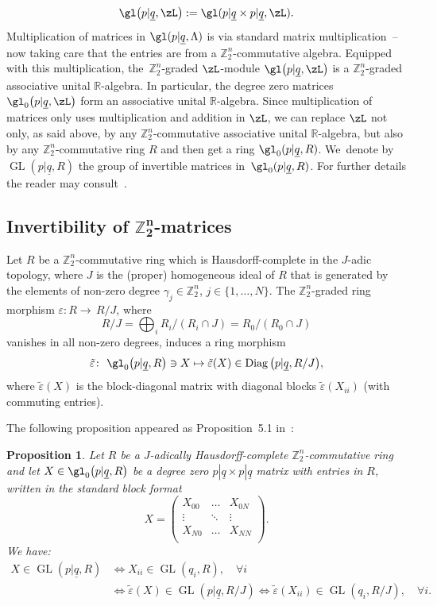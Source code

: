 \documentclass[10pt,a4paper]{amsart}
\newcommand{\op}[1]{\operatorname{#1}}
\DeclareMathOperator{\GL}{GL}
\newcommand{\R}{{\mathbb R}}
\newcommand{\Z}{{\mathbb Z}}
\def\ul{\underline}
\def\ul{\underline}
\newcommand{\0}{\otimes}
\newcommand{\z}{\Z_2^n}
\numberwithin{equation}{section}
\newtheorem{Proposition}[Theorem]{Proposition}
 { \theoremstyle{definition}
\newtheorem{Definition}[Theorem]{Definition}
\newtheorem{Example}[Theorem]{Example}
\newtheorem{Remark}[Theorem]{Remark} }
\begin{document}
\[
\gl\big(p|\ul q,\zL\big):=\gl(p|\ul q \times p|\ul q,\zL).
\]
Multiplication of matrices in $\gl(p|\ul{q},\Lambda)$ is via standard matrix multiplication~-- now taking care that the entries are from a $\Z_2^n$-commutative algebra. Equipped with this multiplication, the~$\z$-graded $\zL$-module $\gl\big(p|\ul q,\zL\big)$ is a $\z$-graded associative unital $\R$-algebra. In particular, the degree zero matrices $\gl_0\big(p|\ul q,\zL\big)$ form an associative unital $\R$-algebra. Since multiplication of matrices only uses multiplication and addition in $\zL$, we can replace $\zL$ not only, as said above, by any $\z$-commutative associative unital $\R$-algebra, but also by any $\z$-commutative ring $R$ and then get a ring $\gl_0(p|\ul q,R)$. We~denote by $\GL(p|\ul q,R)$ the group of invertible matrices in~$\gl_0(p|\ul q,R)$. For further details the reader may consult~\cite{Covolo:2012}.

\subsection[Invertibility of Z2n-matrices]{Invertibility of $\boldsymbol{\z}$-matrices}
Let $R$ be a $\z$-commutative ring which is Hausdorff-complete in the $J$-adic topology, where
$J$ is the (proper) homogeneous ideal of $R$ that is generated by the elements of non-zero degree $\gamma_j\in\Z_2^n$, $j\in\{1,\dots,N\}$. The $\Z_2^n$-graded ring morphism
$\varepsilon\colon R \to \,R/J$, where
\[
R/J=\bigoplus_iR_i/(R_i\cap J)=R_0/(R_0\cap J)
\]
vanishes in all non-zero degrees, induces a ring morphism
\[
\tilde\varepsilon\colon\ \gl_0\big(p|\ul{q},R\big)\ni X\mapsto \tilde\varepsilon(X)\in\op{Diag}\big(p|\ul{q},R/J\big),
\]
where $\tilde\varepsilon(X)$ is the
block-diagonal matrix with diagonal blocks $\tilde\varepsilon(X_{ii})$ (with commuting entries).

The following proposition appeared as Proposition~5.1 in~\cite{CKP2020}:

\begin{Proposition}\label{invertibleblockdiag}
Let $R$ be a $J$-adically Hausdorff-complete $\z$-commutative ring and let $X\in\gl_0\big(p|\ul{q},R\big)$ be a degree zero $p|{\ul q}\times p|{\ul q}$ matrix with entries in $R$, written in the
standard block format
\begin{equation*}
X = \left(\begin{array}{c|c|c}
X_{00} & \dotsc & X_{0N} \\
\hline
\vdots & \ddots & \vdots \\
\hline
X_{N0} & \dotsc & X_{NN} \\
\end{array}\right)\!.
\end{equation*}
We have:
\begin{align*}
X\in\GL(p|\ul q,R)& \Leftrightarrow X_{ii}\in\GL(q_i,R),\quad\forall i\\
&\Leftrightarrow\tilde\varepsilon(X)\in\GL(p|\ul q,R/J)
\Leftrightarrow \tilde\varepsilon(X_{ii})\in\GL(q_i,R/J),\quad\forall i.
\end{align*}
\end{Proposition}
\end{document}
